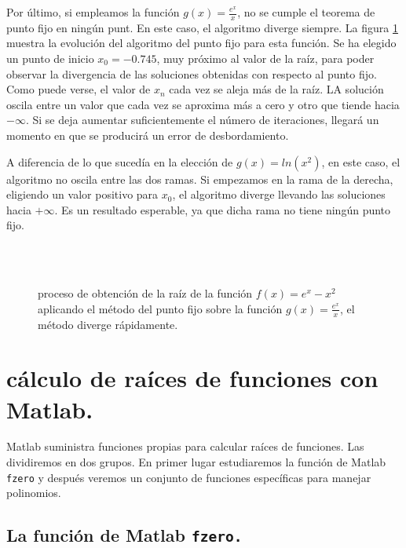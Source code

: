 Por último, si empleamos la función $g(x)=\frac{e^x}{x}$, no se cumple el teorema de punto fijo en ningún punt. En este caso, el algoritmo diverge siempre.  La figura \ref{fig:pfijo5} muestra la evolución del algoritmo del punto fijo para esta función. Se ha elegido un punto de inicio $x_0=-0.745$, muy próximo al valor de la raíz, para poder observar la divergencia de las soluciones obtenidas con respecto al punto fijo. Como puede verse, el valor de $x_n$ cada vez se aleja más de la raíz. LA solución oscila entre un valor que cada vez se aproxima más a cero y otro que tiende hacia $-\infty$. Si se deja aumentar suficientemente el número de iteraciones, llegará un momento en que se producirá un error de desbordamiento. 

A diferencia de lo que sucedía en la elección de $g(x)=ln(x^2)$, en este caso, el algoritmo no oscila entre las dos ramas. Si empezamos en la rama de la derecha, eligiendo un valor positivo para $x_0$, el algoritmo diverge llevando las soluciones hacia $+\infty$. Es un resultado esperable, ya que dicha rama no tiene ningún punto fijo.

\begin{figure}
\centering
{} \qquad
{}\\
\qquad
{}\\
\qquad
{}

\caption{proceso de obtención de la raíz de la función $f(x)=e^x-x^2$ aplicando el método del punto fijo sobre la función $g(x)=\frac{e^x}{x}$, el método diverge rápidamente.}
\label{fig:pfijo5}
\end{figure}

\section{cálculo de raíces de funciones con Matlab.}

Matlab suministra funciones propias para calcular raíces de funciones.  Las dividiremos en dos grupos. En primer lugar estudiaremos la función de Matlab \texttt{fzero} y después veremos un conjunto de funciones específicas para manejar polinomios.

\subsection{La función de Matlab \texttt{fzero.}}

